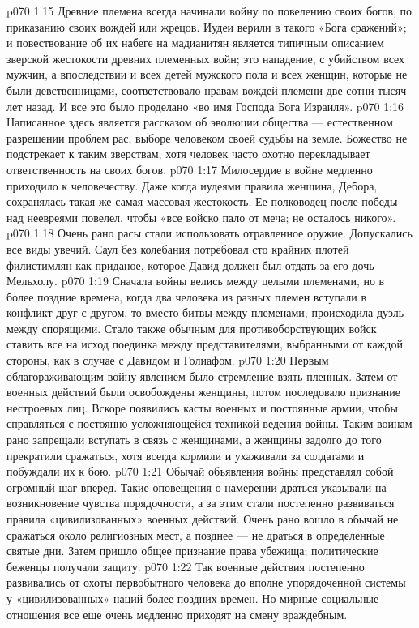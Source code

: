 \vs p070 1:15 \pc Древние племена всегда начинали войну по повелению своих богов, по приказанию своих вождей или жрецов. Иудеи верили в такого «Бога сражений»; и повествование об их набеге на мадианитян является типичным описанием зверской жестокости древних племенных войн; это нападение, с убийством всех мужчин, а впоследствии и всех детей мужского пола и всех женщин, которые не были девственницами, соответствовало нравам вождей племени две сотни тысяч лет назад. И все это было проделано «во имя Господа Бога Израиля».
\vs p070 1:16 Написанное здесь является рассказом об эволюции общества --- естественном разрешении проблем рас, выборе человеком своей судьбы на земле. Божество не подстрекает к таким зверствам, хотя человек часто охотно перекладывает ответственность на своих богов.
\vs p070 1:17 \pc Милосердие в войне медленно приходило к человечеству. Даже когда иудеями правила женщина, Дебора, сохранялась такая же самая массовая жестокость. Ее полководец после победы над неевреями повелел, чтобы «все войско пало от меча; не осталось никого».
\vs p070 1:18 Очень рано расы стали использовать отравленное оружие. Допускались все виды увечий. Саул без колебания потребовал сто крайних плотей филистимлян как приданое, которое Давид должен был отдать за его дочь Мельхолу.
\vs p070 1:19 Сначала войны велись между целыми племенами, но в более поздние времена, когда два человека из разных племен вступали в конфликт друг с другом, то вместо битвы между племенами, происходила дуэль между спорящими. Стало также обычным для противоборствующих войск ставить все на исход поединка между представителями, выбранными от каждой стороны, как в случае с Давидом и Голиафом.
\vs p070 1:20 Первым облагораживающим войну явлением было стремление взять пленных. Затем от военных действий были освобождены женщины, потом последовало признание нестроевых лиц. Вскоре появились касты военных и постоянные армии, чтобы справляться с постоянно усложняющейся техникой ведения войны. Таким воинам рано запрещали вступать в связь с женщинами, а женщины задолго до того прекратили сражаться, хотя всегда кормили и ухаживали за солдатами и побуждали их к бою.
\vs p070 1:21 Обычай объявления войны представлял собой огромный шаг вперед. Такие оповещения о намерении драться указывали на возникновение чувства порядочности, а за этим стали постепенно развиваться правила «цивилизованных» военных действий. Очень рано вошло в обычай не сражаться около религиозных мест, а позднее --- не драться в определенные святые дни. Затем пришло общее признание права убежища; политические беженцы получали защиту.
\vs p070 1:22 Так военные действия постепенно развивались от охоты первобытного человека до вполне упорядоченной системы у «цивилизованных» наций более поздних времен. Но мирные социальные отношения все еще очень медленно приходят на смену враждебным.
